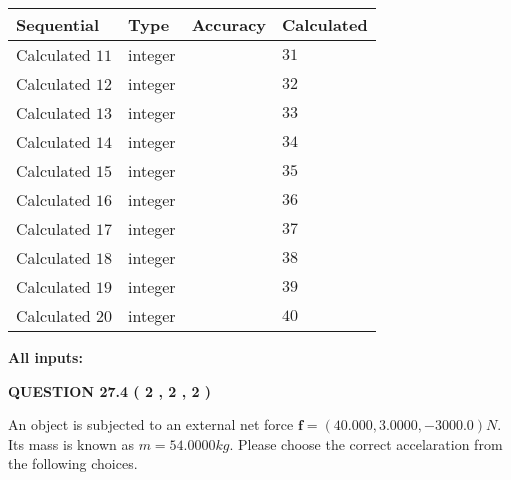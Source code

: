 \documentclass[12pt]{article}
\begin{document}
  
\noindent\begin{tabular}{|l|l|l|l|}
\hline
 Sequential & Type & Accuracy & Calculated \\ 
\hline
 
 
  Calculated $           11 $ & integer &  & 
  $ 31 $ 
 \\  \hline  
 
 
  Calculated $           12 $ & integer &  & 
  $ 32 $ 
 \\  \hline  
 
 
  Calculated $           13 $ & integer &  & 
  $ 33 $ 
 \\  \hline  
 
 
  Calculated $           14 $ & integer &  & 
  $ 34 $ 
 \\  \hline  
 
 
  Calculated $           15 $ & integer &  & 
  $ 35 $ 
 \\  \hline  
 
 
  Calculated $           16 $ & integer &  & 
  $ 36 $ 
 \\  \hline  
 
 
  Calculated $           17 $ & integer &  & 
  $ 37 $ 
 \\  \hline  
 
 
  Calculated $           18 $ & integer &  & 
  $ 38 $ 
 \\  \hline  
 
 
  Calculated $           19 $ & integer &  & 
  $ 39 $ 
 \\  \hline  
 
 
  Calculated $           20 $ & integer &  & 
  $ 40 $ 
 \\  \hline  
 \end{tabular}
   
   
   
   
\noindent\vspace{0.1in}\hspace{-0.08in} {\textbf{\Large{All inputs: }}}
   
   
  
\vspace{0.2in}
  
{\textbf{\Large{QUESTION
27.4 
 (           2 ,           2 ,           2 )
}}}
  
  
 
An object is subjected to an external net force $\mathbf{f}=(
40.000 ,
3.0000,
-3000.0  )N$. Its mass is known as
$m= %
54.0000  kg$. Please choose the correct accelaration
from the following choices.
 
\end{document}
